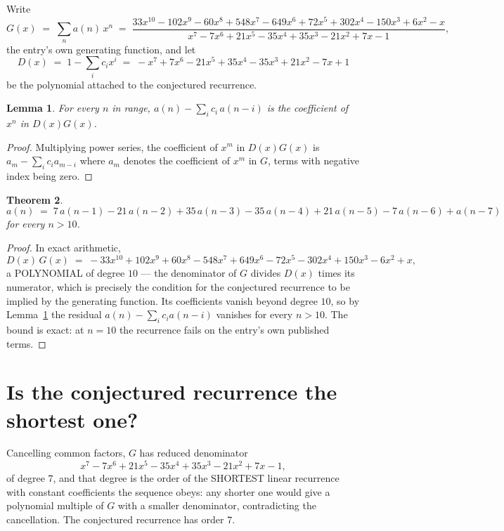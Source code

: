 \documentclass[11pt,a4paper]{article}
\theoremstyle{plain}
\newtheorem{theorem}{Theorem}
\newtheorem{lemma}[theorem]{Lemma}
\theoremstyle{definition}
\begin{document}
Write
\[
G(x)\;=\;\sum_{n}a(n)\,x^{n}\;=\;\frac{33 x^{10} - 102 x^{9} - 60 x^{8} + 548 x^{7} - 649 x^{6} + 72 x^{5} + 302 x^{4} - 150 x^{3} + 6 x^{2} - x}{x^{7} - 7 x^{6} + 21 x^{5} - 35 x^{4} + 35 x^{3} - 21 x^{2} + 7 x - 1},
\]
the entry's own generating function, and let
\[
D(x)\;=\;1-\sum_i c_i x^{i}\;=\;- x^{7} + 7 x^{6} - 21 x^{5} + 35 x^{4} - 35 x^{3} + 21 x^{2} - 7 x + 1
\]
be the polynomial attached to the conjectured recurrence.

\begin{lemma}\label{lem:key}
For every $n$ in range, $a(n)-\sum_i c_i\,a(n-i)$ is the coefficient of $x^{n}$ in
$D(x)G(x)$.
\end{lemma}

\begin{proof}
Multiplying power series, the coefficient of $x^{m}$ in $D(x)G(x)$ is
$a_m-\sum_i c_i a_{m-i}$ where $a_m$ denotes the coefficient of $x^{m}$ in $G$, terms with
negative index being zero.
\end{proof}

\begin{theorem}
\[
a(n)\;=\;7\,a(n-1) - 21\,a(n-2) + 35\,a(n-3) - 35\,a(n-4) + 21\,a(n-5) - 7\,a(n-6) + a(n-7)
\]
for every $n>10$.
\end{theorem}

\begin{proof}
In exact arithmetic,
\[
D(x)\,G(x)\;=\;- 33 x^{10} + 102 x^{9} + 60 x^{8} - 548 x^{7} + 649 x^{6} - 72 x^{5} - 302 x^{4} + 150 x^{3} - 6 x^{2} + x,
\]
a POLYNOMIAL of degree $10$ --- the denominator of $G$ divides $D(x)$ times its numerator,
which is precisely the condition for the conjectured recurrence to be implied by the
generating function. Its coefficients vanish beyond degree $10$, so by
Lemma~\ref{lem:key} the residual $a(n)-\sum_ic_ia(n-i)$ vanishes for every
$n>10$. The bound is exact: at $n=10$ the recurrence fails on the entry's own published terms.
\end{proof}

\section{Is the conjectured recurrence the shortest one?}

Cancelling common factors, $G$ has reduced denominator
\[
x^{7} - 7 x^{6} + 21 x^{5} - 35 x^{4} + 35 x^{3} - 21 x^{2} + 7 x - 1,
\]
of degree $7$, and that degree is the order of the SHORTEST linear recurrence with
constant coefficients the sequence obeys: any shorter one would give a polynomial multiple of
$G$ with a smaller denominator, contradicting the cancellation. The conjectured recurrence has
order $7$.
\end{document}
